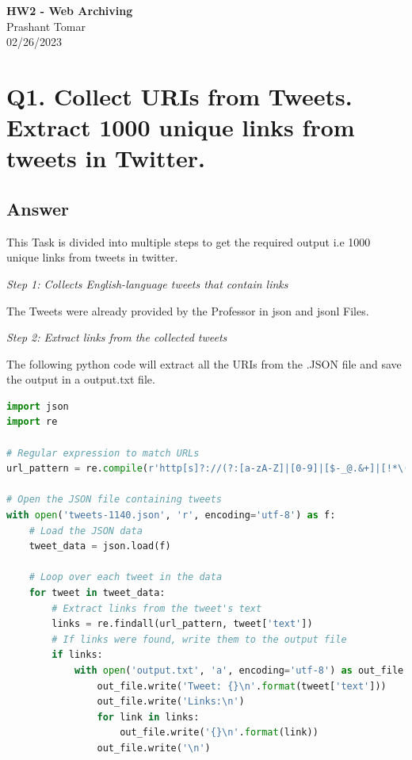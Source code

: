 \documentclass[12pt]{article}
\begin{document}
\begin{centering}
{\large\textbf{HW2 - Web Archiving}}\\ 
Prashant Tomar\\
02/26/2023\\
\end{centering}


\section*{Q1. Collect URIs from Tweets. Extract 1000 unique links from tweets in Twitter.}



\subsection*{Answer}

This Task is divided into multiple steps to get the required output i.e 1000 unique links from tweets in twitter.

\emph{Step 1: Collects English-language tweets that contain links}

The Tweets were already provided by the Professor in json and jsonl Files.


\emph{Step 2: Extract links from the collected tweets}

The following python code will extract all the URIs from the .JSON file and save the output in a output.txt file.

\begin{lstlisting}[language=Python, caption=Extract the URIs from the .JSON file, label=lst:copy]
import json
import re

# Regular expression to match URLs
url_pattern = re.compile(r'http[s]?://(?:[a-zA-Z]|[0-9]|[$-_@.&+]|[!*\(\),]|(?:%[0-9a-fA-F][0-9a-fA-F]))+')

# Open the JSON file containing tweets
with open('tweets-1140.json', 'r', encoding='utf-8') as f:
    # Load the JSON data
    tweet_data = json.load(f)

    # Loop over each tweet in the data
    for tweet in tweet_data:
        # Extract links from the tweet's text
        links = re.findall(url_pattern, tweet['text'])
        # If links were found, write them to the output file
        if links:
            with open('output.txt', 'a', encoding='utf-8') as out_file:
                out_file.write('Tweet: {}\n'.format(tweet['text']))
                out_file.write('Links:\n')
                for link in links:
                    out_file.write('{}\n'.format(link))
                out_file.write('\n')

  
\end{lstlisting}
\end{document}

